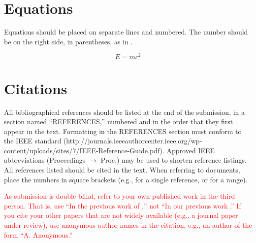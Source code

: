 \documentclass{article}
\begin{document}
\section{Equations}

Equations should be placed on separate lines and numbered.
The number should be on the right side, in parentheses, as in .

\begin{equation}\label{relativity}
E=mc^{2}
\end{equation}

\section{Citations}

All bibliographical references should be listed at the end of the submission, in a section named ``REFERENCES,''
numbered and in the order that they first appear in the text. Formatting in the REFERENCES section must conform to the
IEEE standard (http://journals.ieeeauthorcenter.ieee.org/wp-content/uploads/sites/7/IEEE-Reference-Guide.pdf). Approved
IEEE abbreviations (Proceedings $\rightarrow$ Proc.) may be used to shorten reference listings. All references listed
should be cited in the text. When referring to documents, place the numbers in square brackets (e.g., \cite{ISMIR17Author:01}
for a single reference, or \cite{JNMR10Someone:01,Book20Person:01,Chapter09Person:01} for a range).

\textcolor{red}{As submission is double blind, refer to your own published work in the third person. That is, use ``In the previous work of \cite{ISMIR17Author:01},'' not ``In our previous work \cite{ISMIR17Author:01}.'' If you cite your other papers that are not widely available (e.g., a journal paper under review), use anonymous author names in the citation, e.g., an author of the form ``A. Anonymous.''}



%
%
%
%
%
\end{document}

